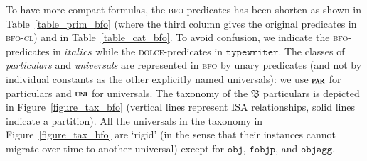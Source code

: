 \documentclass[ao]{iosart2x}
\newcommand{\nb}[1]{\textcolor{red}{$|$}\marginpar{\hspace*{-0cm}\parbox{20mm}{\scriptsize\raggedright\textcolor{red}{#1}}}}
\newcommand{\bfoAxLabel}{\textrm{a$_\texttt{b}$}}
\newcommand{\bfoDefLabel}{\textrm{d$_\texttt{b}$}}
\newcommand{\refbfoax}[1]{({\bfoAxLabel}\ref{#1})}
\newcommand{\refbfodf}[1]{({\bfoDefLabel}\ref{#1})}
\newcommand{\cn}[1]{\mathtt{#1}}
\newcommand{\dolce}{{\textsc{dolce}}}
\newcommand{\bfo}{{\textsc{bfo}}}
\newcommand{\bfocl}{{\textsc{bfo-cl}}}
\newcommand {\thbfo} {\ensuremath{\mathfrak{B}}}
\newcommand{\objbcat}{\cn{obj}}
\newcommand{\fobjbcat}{\cn{fobjp}}
\newcommand{\objaggbcat}{\cn{objagg}}
\newcommand{\bfopartic}{\textsc{par}}
\newcommand{\bfouniv}{\textsc{uni}}
\begin{document}
To have more compact formulas, the {\bfo} predicates has been shorten as shown in Table~\ref{table_prim_bfo} (where the third column gives the original predicates in {\bfocl}) and in Table~\ref{table_cat_bfo}. To avoid confusion, we indicate the {\bfo}-predicates in $\mathit{italics}$ while the {\dolce}-predicates in $\mathtt{type writer}$.
The classes of \emph{particulars} and \emph{universals} are represented in {\bfo} by unary predicates (and not by individual constants as the other explicitly named universals): we use $\bfopartic$ for particulars and $\bfouniv$ for universals. %
The taxonomy of the $\thbfo$ particulars is depicted in Figure~\ref{figure_tax_bfo} (vertical lines represent ISA relationships, solid lines indicate a partition). All the universals in the taxonomy in Figure~\ref{figure_tax_bfo} are `rigid' (in the sense that their instances cannot migrate over time to another universal) except for $\objbcat$, $\fobjbcat$, and $\objaggbcat$. %




\end{document}
